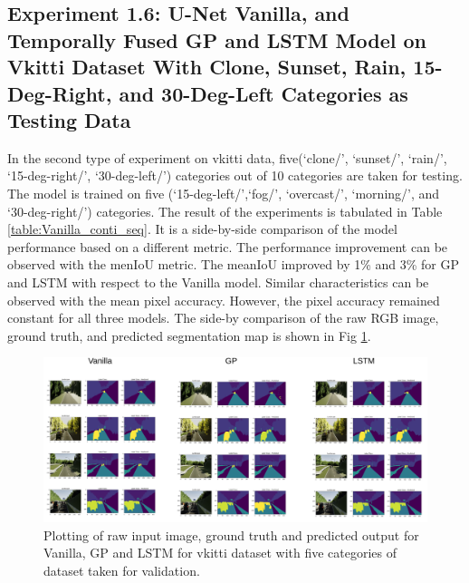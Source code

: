 	\subsection{Experiment 1.6: U-Net Vanilla, and Temporally Fused GP and LSTM Model on Vkitti Dataset With Clone, Sunset, Rain, 15-Deg-Right, and 30-Deg-Left Categories as Testing Data}
		
	In the second type of experiment on vkitti data, five(`clone/', `sunset/', `rain/', `15-deg-right/',
	`30-deg-left/') categories out of 10 categories are taken for testing. The model is trained on five (`15-deg-left/',`fog/', `overcast/', `morning/', and `30-deg-right/') categories. The result of the experiments is tabulated in Table \ref{table:Vanilla_conti_seq}. It is a side-by-side comparison of the model performance based on a different metric. The performance improvement can be observed with the menIoU metric. The meanIoU improved by 1\% and 3\% for GP and LSTM with respect to the Vanilla model. Similar characteristics can be observed with the mean pixel accuracy. However, the pixel accuracy remained constant for all three models. The side-by comparison of the raw RGB image, ground truth, and predicted segmentation map is shown in Fig \ref{fig:unet_side_by_side_five_classes}. 
	
	\begin{figure}
		\centering
		\includegraphics[width=17cm]{images/unet_vkitti_five.png}
		\caption{Plotting of raw input image, ground truth and predicted output for Vanilla, GP and LSTM for vkitti dataset with five categories of dataset taken for validation.}
		\label{fig:unet_side_by_side_five_classes}
	\end{figure}

